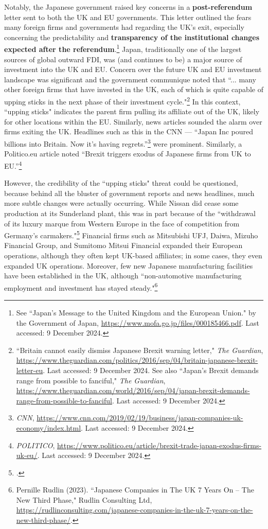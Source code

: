 \documentclass[preprint,11pt,authoryear]{elsarticle}
\begin{document}
Notably, the Japanese government raised key concerns in a \textbf{post-referendum} letter sent to both the UK and EU governments. This letter outlined the fears many foreign firms and governments had regarding the UK's exit, especially concerning the predictability and \textbf{transparency of the institutional changes expected after the referendum}.\footnote{See ``Japan’s Message to the United Kingdom and the European Union." by the Government of Japan, \url{https://www.mofa.go.jp/files/000185466.pdf}. Last accessed: 9 December 2024.} Japan, traditionally one of the largest sources of global outward FDI, was (and continues to be) a major source of investment into the UK and EU. Concern over the future UK and EU investment landscape was significant and the government communique noted that ``... many other foreign firms that have invested in the UK, each of which is quite capable of upping sticks in the next phase of their investment cycle."\footnote{``Britain cannot easily dismiss Japanese Brexit warning letter," \textit{The Guardian}, \url{https://www.theguardian.com/politics/2016/sep/04/britain-japanese-brexit-letter-eu}.  Last accessed: 9 December 2024. See also ``Japan's Brexit demands range from possible to fanciful,"  \textit{The Guardian}, \url{https://www.theguardian.com/world/2016/sep/04/japan-brexit-demands-range-from-possible-to-fanciful}. Last accessed: 9 December 2024.} In this context, ``upping sticks" indicates the parent firm pulling its affiliate out of the UK, likely for other locations within the EU.  
Similarly, news articles sounded the alarm over firms exiting the UK. 
Headlines such as this in the CNN --- ``Japan Inc poured billions into Britain. Now it's having regrets.''\footnote{\textit{CNN}, \url{https://www.cnn.com/2019/02/19/business/japan-companies-uk-economy/index.html}. Last accessed: 9 December 2024.} were prominent. Similarly, a Politico.eu article noted ``Brexit triggers exodus of Japanese firms from UK to EU.''\footnote{\textit{POLITICO}, \url{https://www.politico.eu/article/brexit-trade-japan-exodus-firms-uk-eu/}. Last accessed: 9 December 2024.}

However, the credibility of the ``upping sticks" threat could be questioned, because behind all the bluster of government reports and news headlines, much more subtle changes were actually occurring. While Nissan did cease some production at its Sunderland plant, this was in part because of the ``withdrawal of its luxury marque from Western Europe in the face of competition from Germany's carmakers."\footnote{\cite{maidment2019brexit}.} Financial firms such as Mitsubishi UFJ, Daiwa, Mizuho Financial Group, and Sumitomo Mitsui Financial expanded their European operations, although they often kept UK-based affiliates; in some cases, they even expanded UK operations. Moreover, few new Japanese manufacturing facilities have been established in the UK, although ``non-automotive manufacturing employment and investment has stayed steady."\footnote{Pernille Rudlin (2023). ``Japanese Companies in The UK 7 Years On – The New Third Phase," Rudlin Consulting Ltd, \url{https://rudlinconsulting.com/japanese-companies-in-the-uk-7-years-on-the-new-third-phase/}.}
\end{document}
